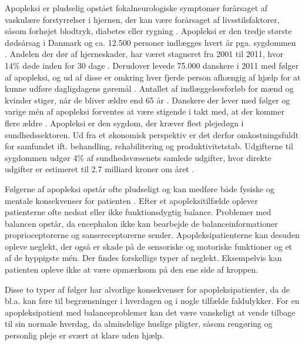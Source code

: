 Apopleksi er pludselig opstået fokalneurologiske symptomer forårsaget af vaskulære forstyrrelser i hjernen, der kan være forårsaget af livsstilsfaktorer, såsom forhøjet blodtryk, diabetes eller rygning \cite{Sundhedsstyrelsen2009,Academic2015}. Apopleksi er den tredje største dødsårsag i Danmark og ca. 12.500 personer indlægges hvert år pga. sygdommen \cite{Hjernesagen2015a}. Andelen der dør af hjerneskader, har været stagneret fra 2001 til 2011, hvor 14\% døde inden for 30 dage \cite{Hjernesagen2015}. Derudover levede 75.000 danskere i 2011 med følger af apopleksi, og ud af disse er omkring hver fjerde person afhængig af hjælp for at kunne udføre dagligdagens gøremål \cite{Hjernesagen2015a}. Antallet af indlæggelsesforløb for mænd og kvinder stiger, når de bliver ældre end 65 år \cite{Sundhedsstyrelsen2011}.
Danskere der lever med følger og varige mén af apopleksi forventes at være stigende i takt med, at der kommer flere ældre \cite{Sagen2014}. Apopleksi er den sygdom, der kræver flest plejedøgn i sundhedssektoren. Ud fra et økonomisk perspektiv er det derfor omkostningsfuldt for samfundet ift. behandling, rehabilitering og produktivitetstab.  Udgifterne til sygdommen udgør 4\% af sundhedsvæsenets samlede udgifter, hvor direkte udgifter er estimeret til 2.7 milliard kroner om året \cite{Hjernesagen2015a, Kruuse2014}.
 
Følgerne af apopleksi opstår ofte pludseligt og kan medføre både fysiske og mentale konsekvenser for patienten \cite{Muus2008}. Efter et apopleksitilfælde oplever  patienterne ofte nedsat eller ikke funktionsdygtig balance. Problemer med balancen opstår, da encephalon ikke kan bearbejde de balanceinformationer proprioceptorerne og sansereceptorerne sender. \cite{Karnath2003} Apopleksipatienterne kan desuden opleve neglekt, der også er skade på de sensoriske og motoriske funktioner og et af de hyppigste mén. Der findes forskellige typer af neglekt. Eksempelvis kan patienten opleve ikke at være opmærksom på den ene side af kroppen. \cite{Sundhed.dk} 

Disse to typer af følger har alvorlige konsekvenser for apopleksipatienter, da de bl.a. kan føre til begrænsninger i hverdagen og i nogle tilfælde faldulykker. \cite{Muus2008,Nichols1997} For en apopleksipatient med balanceproblemer kan det være vanskeligt at vende tilbage til sin normale hverdag, da almindelige huslige pligter, såsom rengøring og personlig pleje er svært at klare uden hjælp. \cite{Sundhedsstyrelsen2010} \\  

